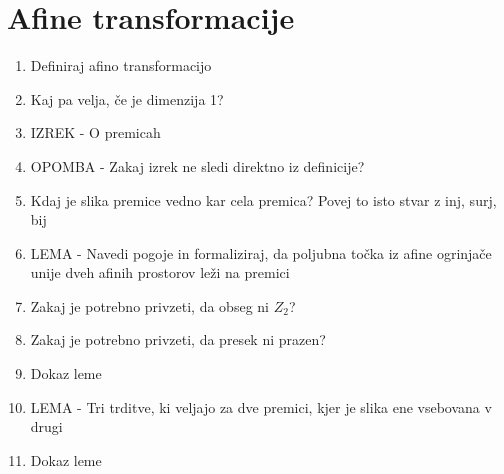 \documentclass{article}
\begin{document}
    \section{Afine transformacije}
    \begin{enumerate}
        \item Definiraj afino transformacijo
        \item Kaj pa velja, če je dimenzija 1?
        \item IZREK - O premicah
        \item OPOMBA - Zakaj izrek ne sledi direktno iz definicije?
        \item Kdaj je slika premice vedno kar cela premica? Povej to isto stvar z inj, surj, bij
        \item LEMA - Navedi pogoje in formaliziraj, da poljubna točka iz afine ogrinjače unije dveh afinih prostorov leži na premici
        \item Zakaj je potrebno privzeti, da obseg ni $Z_2$?
        \item Zakaj je potrebno privzeti, da presek ni prazen?
        \item Dokaz leme
        \item LEMA - Tri trditve, ki veljajo za dve premici, kjer je slika ene vsebovana v drugi
        \item Dokaz leme
\end{enumerate}
\end{document}
